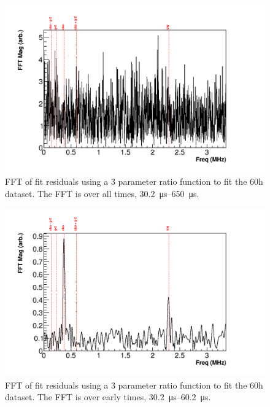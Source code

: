 \documentclass[12pt,letterpaper]{article}
\begin{document}
\begin{figure}[]
    \centering
    \includegraphics[width=.8\textwidth]{FFT_3param_allTimes}
    \caption[]{FFT of fit residuals using a 3 parameter ratio function to fit the 60h dataset. The FFT is over all times, \SIrange{30.2}{650}{\micro s}.}
    \label{fig:FFT_3param_allTimes}
\end{figure}

\begin{figure}[]
    \centering
    \includegraphics[width=.8\textwidth]{FFT_3param_earlyTimes}
    \caption[]{FFT of fit residuals using a 3 parameter ratio function to fit the 60h dataset. The FFT is over early times, \SIrange{30.2}{60.2}{\micro s}.}
    \label{fig:FFT_3param_earlyTimes}
\end{figure}
\end{document}
